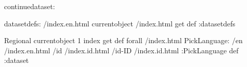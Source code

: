 \begin{ingrid}
continuedataset:

datasetdefs:
/index.en.html currentobject /index.html get def
:datasetdefs

{ Regional } { currentobject 1 index get def } forall
/index.html {
PickLanguage:
/en /index.en.html
/id /index.id.html
/id-ID /index.id.html
:PickLanguage
} def
:dataset
\end{ingrid}
